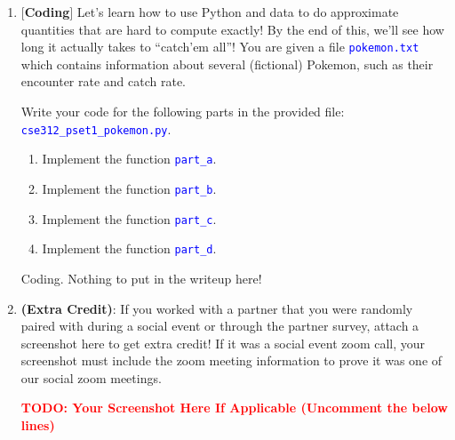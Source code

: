 \documentclass[12pt]{article}
\def\code#1{\textcolor{blue}{\texttt{#1}}}
\def\todo#1{\textcolor{red}{\textbf{#1}}}
\renewcommand{\|}{\mid}
\begin{document}
\begin{enumerate}
\item \textbf{$[$Coding$]$} Let's learn how to use Python and data to do approximate quantities that are hard to compute exactly! By the end of this, we'll see how long it actually takes to ``catch'em all''! You are given a file \code{pokemon.txt} which contains information about several (fictional) Pokemon, such as their encounter rate and catch rate. 

Write your code for the following parts in the provided file: \code{cse312\_pset1\_pokemon.py}.

\begin{enumerate}
    \item Implement the function \code{part\_a}.
    \item Implement the function \code{part\_b}.
    \item Implement the function \code{part\_c}. %
    \item Implement the function \code{part\_d}. %
\end{enumerate}

\begin{tcolorbox}
Coding. Nothing to put in the writeup here!
\end{tcolorbox}


\item \textbf{(Extra Credit)}: If you worked with a partner that you were randomly paired with during a social event or through the partner survey, attach a screenshot here to get extra credit! If it was a social event zoom call, your screenshot must include the zoom meeting information to prove it was one of our social zoom meetings.
\begin{tcolorbox}
\todo{TODO: Your Screenshot Here If Applicable (Uncomment the below lines)} 
\end{tcolorbox}


\end{enumerate}
\end{document}
